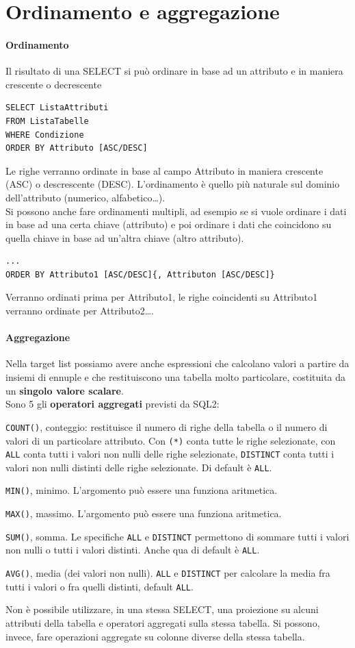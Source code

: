 \documentclass[10pt]{book}
\begin{document}
\section{Ordinamento e aggregazione}
\paragraph{Ordinamento} Il risultato di una SELECT si può ordinare in base ad un attributo e in maniera crescente o decrescente
\begin{lstlisting}
SELECT ListaAttributi
FROM ListaTabelle
WHERE Condizione
ORDER BY Attributo [ASC/DESC]
\end{lstlisting}
Le righe verranno ordinate in base al campo Attributo in maniera crescente (ASC) o descrescente (DESC). L'ordinamento è quello più naturale sul dominio dell'attributo (numerico, alfabetico\ldots).\\
Si possono anche fare ordinamenti multipli, ad esempio se si vuole ordinare i dati in base ad una certa chiave (attributo) e poi ordinare i dati che coincidono su quella chiave in base ad un'altra chiave (altro attributo).
\begin{lstlisting}
...
ORDER BY Attributo1 [ASC/DESC]{, Attributon [ASC/DESC]}
\end{lstlisting}
Verranno ordinati prima per Attributo1, le righe coincidenti su Attributo1 verranno ordinate per Attributo2\ldots.
\paragraph{Aggregazione} Nella target list possiamo avere anche espressioni che calcolano valori a partire da insiemi di ennuple e che restituiscono una tabella molto particolare, costituita da un \textbf{singolo valore scalare}.\\
Sono 5 gli \textbf{operatori aggregati} previsti da SQL2:
\begin{list}{}{}
	\item \texttt{COUNT()}, conteggio: restituisce il numero di righe della tabella o il numero di valori di un particolare attributo. Con \texttt{(*)} conta tutte le righe selezionate, con \texttt{ALL} conta tutti i valori non nulli delle righe selezionate, \texttt{DISTINCT} conta tutti i valori non nulli distinti delle righe selezionate. Di default è \texttt{ALL}.
	\item \texttt{MIN()}, minimo. L'argomento può essere una funziona aritmetica.
	\item \texttt{MAX()}, massimo. L'argomento può essere una funziona aritmetica.
	\item \texttt{SUM()}, somma. Le specifiche \texttt{ALL} e \texttt{DISTINCT} permettono di sommare tutti i valori non nulli o tutti i valori distinti. Anche qua di default è \texttt{ALL}.
	\item \texttt{AVG()}, media (dei valori non nulli). \texttt{ALL} e \texttt{DISTINCT} per calcolare la media fra tutti i valori o fra quelli distinti, default \texttt{ALL}.
\end{list}
Non è possibile utilizzare, in una stessa SELECT, una proiezione su alcuni attributi della tabella e operatori aggregati sulla stessa tabella. Si possono, invece, fare operazioni aggregate su colonne diverse della stessa tabella.
\end{document}
